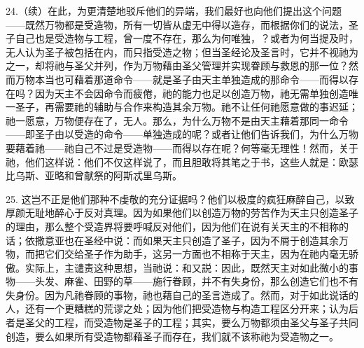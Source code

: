 24.（续）在此，为更清楚地驳斥他们的异端，我们最好也向他们提出这个问题——既然万物都是受造物，所有一切皆从虚无中得以造存，而根据你们的说法，圣子自己也是受造物与工程，曾一度不存在，那么为何唯独，？或者为何当提及时，无人认为圣子被包括在内，而只指受造之物；但当圣经论及圣言时，它并不视祂为之一，却将祂与圣父并列，作为万物藉由圣父管理并实现眷顾与救恩的那一位？然而万物本当也可藉着那道命令——就是圣子由天主单独造成的那命令——而得以存在吗？因为天主不会因命令而疲倦，祂的能力也足以创造万物，祂无需单独创造唯一圣子，再需要祂的辅助与合作来构造其余万物。祂不让任何祂愿意做的事迟延；祂一愿意，万物便存在了，无人。那么，为什么万物不是由天主藉着那同一命令——即圣子由以受造的命令——单独造成的呢？或者让他们告诉我们，为什么万物要藉着祂——祂自己不过是受造物——而得以存在呢？何等毫无理性！然而，关于祂，他们这样说：他们不仅这样说了，而且胆敢将其笔之于书，这些人就是：欧瑟比乌斯、亚略和曾献祭的阿斯忒里乌斯。\par

25. 这岂不正是他们那种不虔敬的充分证据吗？他们以极度的疯狂麻醉自己，以致厚颜无耻地醉心于反对真理。因为如果他们以创造万物的劳苦作为天主只创造圣子的理由，那么整个受造界将要呼喊反对他们，因为他们在说有关天主的不相称的话；依撒意亚也在圣经中说：而如果天主只创造了圣子，因为不屑于创造其余万物，而把它们交给圣子作为助手，这另一方面也不相称于天主，因为在祂内毫无骄傲。实际上，主谴责这种思想，当祂说：和又説：因此，既然天主对如此微小的事物——头发、麻雀、田野的草——施行眷顾，并不有失身份，那么创造它们也不有失身份。因为凡祂眷顾的事物，祂也藉自己的圣言造成了。然而，对于如此说话的人，还有一个更糟糕的荒谬之处；因为他们把受造物与构造工程区分开来；认为后者是圣父的工程，而受造物是圣子的工程；其实，要么万物都须由圣父与圣子共同创造，要么如果所有受造物都藉圣子而存在，我们就不该称祂为受造物之一。\par

